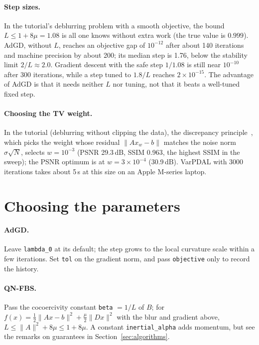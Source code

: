 \documentclass[11pt,a4paper]{article}
\newcommand{\code}[1]{\texttt{#1}}
\begin{document}
\paragraph{Step sizes.} In the tutorial's deblurring problem with a smooth
objective, the bound $L\le1+8\mu=1.08$ is all one knows without extra work
(the true value is $0.999$). AdGD, without $L$, reaches an objective gap of
$10^{-12}$ after about 140 iterations and machine precision by about 200;
its median step is 1.76, below the stability limit $2/L\approx2.0$.
Gradient descent with the safe step $1/1.08$ is still near $10^{-10}$ after
300 iterations, while a step tuned to $1.8/L$ reaches $2\times10^{-15}$. The
advantage of AdGD is that it needs neither $L$ nor tuning, not that it beats
a well-tuned fixed step.

\paragraph{Choosing the TV weight.} In the tutorial (deblurring without
clipping the data), the discrepancy principle~\cite{Morozov1966}, which picks
the weight whose residual $\|Ax_w-b\|$ matches the noise norm
$\sigma\sqrt N$, selects $w=10^{-3}$ (PSNR 29.3\,dB, SSIM 0.963, the highest
SSIM in the sweep); the PSNR optimum is at $w=3\times10^{-4}$ (30.9\,dB).
VarPDAL with 3000 iterations takes about 5\,s at this size on an Apple
M-series laptop.

\section{Choosing the parameters}

\paragraph{AdGD.} Leave \code{lambda\_0} at its default; the step grows to
the local curvature scale within a few iterations. Set \code{tol} on the
gradient norm, and pass \code{objective} only to record the history.

\paragraph{QN-FBS.} Pass the cocoercivity constant \code{beta} $=1/L$ of
$B$; for $f(x)=\tfrac12\|Ax-b\|^2+\tfrac\mu2\|Dx\|^2$ with the blur and
gradient above, $L\le\|A\|^2+8\mu\le1+8\mu$. A constant
\code{inertial\_alpha} adds momentum, but see the remarks on guarantees in
Section~\ref{sec:algorithms}.
\end{document}
